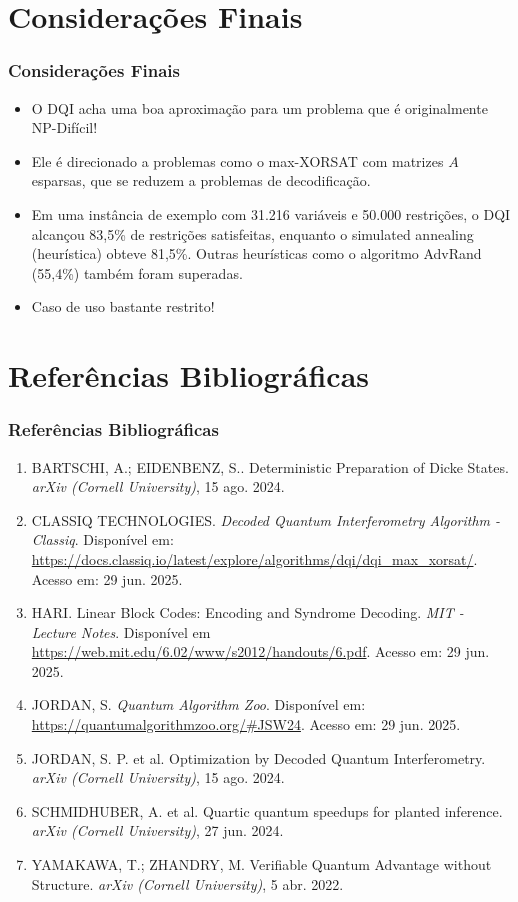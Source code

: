 \documentclass[aspectratio=169]{beamer}
\begin{document}
\section{Considerações Finais}
\begin{frame}
  \frametitle{Considerações Finais}
  
  \begin{itemize}
    \item O DQI acha uma boa aproximação para um problema que é originalmente NP-Difícil!
    \item Ele é direcionado a problemas como o max-XORSAT com matrizes $A$ esparsas, que se reduzem a problemas de decodificação.
    \item Em uma instância de exemplo com 31.216 variáveis e 50.000 restrições, o DQI alcançou 83,5\% de restrições satisfeitas, enquanto o simulated annealing (heurística) obteve 81,5\%. Outras heurísticas como o algoritmo AdvRand (55,4\%) também foram superadas.
    \item Caso de uso bastante restrito!
  \end{itemize}
  
\end{frame}

\section{Referências Bibliográficas}

\begin{frame}[fragile]
  \frametitle{Referências Bibliográficas}
  
  \begin{enumerate}
    \footnotesize
    \item BARTSCHI, A.; EIDENBENZ, S.. Deterministic Preparation of Dicke States. \textit{arXiv (Cornell University)}, 15 ago. 2024.
    \item CLASSIQ TECHNOLOGIES. \textit{Decoded Quantum Interferometry Algorithm - Classiq}. Disponível em: \url{https://docs.classiq.io/latest/explore/algorithms/dqi/dqi_max_xorsat/}. Acesso em: 29 jun. 2025.
    \item HARI. Linear Block Codes: Encoding and Syndrome Decoding. \textit{MIT - Lecture Notes}. Disponível em \url{https://web.mit.edu/6.02/www/s2012/handouts/6.pdf}. Acesso em: 29 jun. 2025.
    \item JORDAN, S. \textit{Quantum Algorithm Zoo}. Disponível em: \url{https://quantumalgorithmzoo.org/#JSW24}. Acesso em: 29 jun. 2025.
    \item JORDAN, S. P. et al. Optimization by Decoded Quantum Interferometry. \textit{arXiv (Cornell University)}, 15 ago. 2024.
    \item SCHMIDHUBER, A. et al. Quartic quantum speedups for planted inference. \textit{arXiv (Cornell University)}, 27 jun. 2024.
    \item YAMAKAWA, T.; ZHANDRY, M. Verifiable Quantum Advantage without Structure. \textit{arXiv (Cornell University)}, 5 abr. 2022.
  \end{enumerate}
  
\end{frame}
\end{document}
